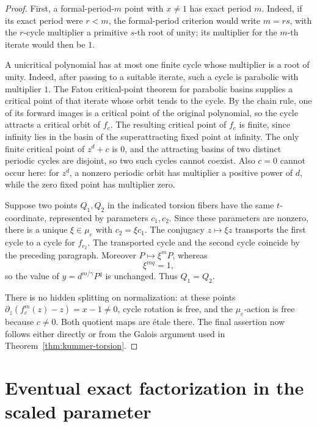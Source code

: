 \begin{proof}
First, a formal-period-$m$ point with $x\ne1$ has exact period $m$.
Indeed, if its exact period were $r<m$, the formal-period criterion
\cite[Theorem 4.5(b)]{Silverman2007} would write $m=rs$, with the
$r$-cycle multiplier a primitive $s$-th root of unity; its multiplier
for the $m$-th iterate would then be $1$.

A unicritical polynomial has at most one finite cycle whose multiplier
is a root of unity.  Indeed, after passing to a suitable iterate, such
a cycle is parabolic with multiplier $1$.  The Fatou critical-point
theorem for parabolic basins \cite[Theorem 10.15]{Milnor2006} supplies
a critical point of that iterate whose orbit tends to the cycle.  By
the chain rule, one of its forward images is a critical point of the
original polynomial, so the cycle attracts a critical orbit of
$f_c$.  The resulting critical point of $f_c$ is finite, since infinity
lies in the basin of the superattracting fixed point at infinity.  The
only finite critical point of $z^d+c$ is $0$, and the attracting basins
of two distinct periodic cycles are disjoint, so two such cycles cannot
coexist.  Also
$c=0$ cannot occur here: for $z^d$, a nonzero periodic orbit has
multiplier a positive power of $d$, while the zero fixed point has
multiplier zero.

Suppose two points $Q_1,Q_2$ in the indicated torsion fibers have the
same $t$-coordinate, represented by parameters $c_1,c_2$.  Since these
parameters are nonzero, there is a unique $\xi\in\mu_e$ with
$c_2=\xi c_1$.  The conjugacy $z\mapsto\xi z$ transports the first
cycle to a cycle for $f_{c_2}$.  The transported cycle and the second
cycle coincide by the preceding paragraph.  Moreover $P\mapsto\xi^mP$,
whereas
\[
 \xi^{mq}=1,
\]
so the value of $y=d^{m/\gamma}P^q$ is unchanged.  Thus $Q_1=Q_2$.

There is no hidden splitting on normalization: at these points
$\partial_z(f_c^m(z)-z)=x-1\ne0$, cycle rotation is free, and the
$\mu_e$-action is free because $c\ne0$.  Both quotient maps are \'etale
there.  The final assertion now follows either directly or from the
Galois argument used in Theorem~\ref{thm:kummer-torsion}.
\end{proof}

\section{Eventual exact factorization in the scaled parameter}
\label{sec:unicritical-factorization}

